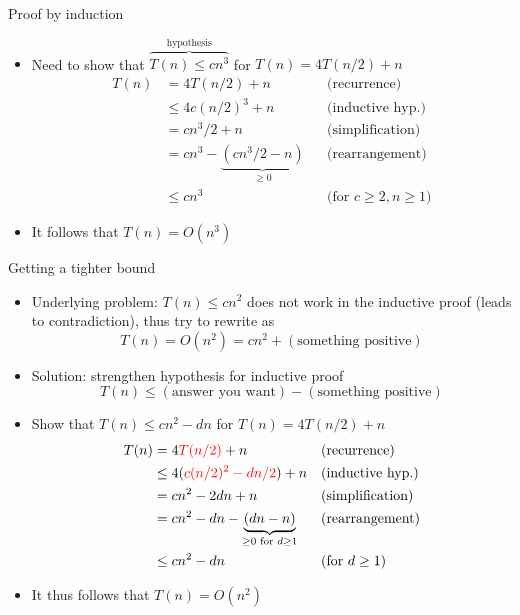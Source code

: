 Proof by induction
\begin{itemize}
    \item Need to show that $\overbrace{T(n)\leq cn^3}^\text{hypothesis}$ for $T(n)=4T(n/2)+n$
    \begin{align*}
        T(n) &= 4T(n/2)+n &&\text{(recurrence)}\\
        &\leq 4c(n/2)^3 + n &&\text{(inductive hyp.)}\\
        &=cn^3/2 + n &&\text{(simplification)}\\
        &= cn^3 -\underbrace{(cn^3/2-n)}_{\geq 0} &&\text{(rearrangement)}\\
        &\leq cn^3 &&\text{(for $c\geq2, n\geq1$)}
    \end{align*}
    \item It follows that $T(n)=O(n^3)$
\end{itemize}
Getting a tighter bound 
\begin{itemize}
    \item Underlying problem: $T(n)\leq cn^2$ does not work in the inductive proof (leads to contradiction), thus try to rewrite as \[
    T(n)=O(n^2) = cn^2 + (\text{something positive})
    \]\item Solution: strengthen hypothesis for inductive proof \[
    T(n) \leq (\text{answer you want})- (\text{something positive})
    \]
        \item Show that $T(n)\leq cn^2-dn$ for $T(n)=4T(n/2)+n$
    \begin{align*}
        T(n) &= 4\textcolor{red}{T(n/2)}+n &&\text{(recurrence)}\\
        &\leq 4(\textcolor{red}{c(n/2)^2-dn/2})+n &&\text{(inductive hyp.)}\\
        &=cn^2-2dn + n &&\text{(simplification)}\\
        &= cn^2 - dn -\underbrace{(dn-n)}_{\geq 0 \text{ for } d\geq 1} &&\text{(rearrangement)}\\
        &\leq cn^2 - dn &&\text{(for $d\geq1$)}
    \end{align*}
    \item It thus follows that $T(n)=O(n^2)$
\end{itemize}


